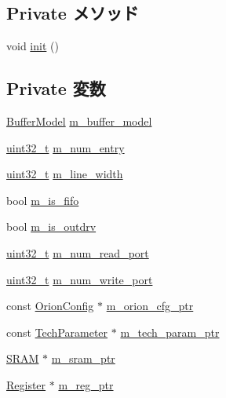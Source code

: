 \subsection*{Private メソッド}
\begin{DoxyCompactItemize}
\item 
void \hyperlink{classBuffer_a02fd73d861ef2e4aabb38c0c9ff82947}{init} ()
\end{DoxyCompactItemize}
\subsection*{Private 変数}
\begin{DoxyCompactItemize}
\item 
\hyperlink{classBuffer_aaa1b52e516aa86db344256019b904840}{BufferModel} \hyperlink{classBuffer_a9834deea607a93506904e1f399737596}{m\_\-buffer\_\-model}
\item 
\hyperlink{Type_8hh_a435d1572bf3f880d55459d9805097f62}{uint32\_\-t} \hyperlink{classBuffer_a291c35e9632031ebe307862c5c760519}{m\_\-num\_\-entry}
\item 
\hyperlink{Type_8hh_a435d1572bf3f880d55459d9805097f62}{uint32\_\-t} \hyperlink{classBuffer_add4c54b54475120d0e1547d3a9c48f44}{m\_\-line\_\-width}
\item 
bool \hyperlink{classBuffer_a6278bce84ca8f1587dbb706ad2d20012}{m\_\-is\_\-fifo}
\item 
bool \hyperlink{classBuffer_abf268b469077bf0460d0043b68443b6a}{m\_\-is\_\-outdrv}
\item 
\hyperlink{Type_8hh_a435d1572bf3f880d55459d9805097f62}{uint32\_\-t} \hyperlink{classBuffer_a0bf03d796dd95afdc5077aa3a1bef997}{m\_\-num\_\-read\_\-port}
\item 
\hyperlink{Type_8hh_a435d1572bf3f880d55459d9805097f62}{uint32\_\-t} \hyperlink{classBuffer_a2c7430e3adc3731c7d4d7b23a12bc0e2}{m\_\-num\_\-write\_\-port}
\item 
const \hyperlink{classOrionConfig}{OrionConfig} $\ast$ \hyperlink{classBuffer_a84de60ae1f7ca812df5347e27a658c77}{m\_\-orion\_\-cfg\_\-ptr}
\item 
const \hyperlink{classTechParameter}{TechParameter} $\ast$ \hyperlink{classBuffer_a11d1644aa2bfe0e16783dface6fadf13}{m\_\-tech\_\-param\_\-ptr}
\item 
\hyperlink{classSRAM}{SRAM} $\ast$ \hyperlink{classBuffer_a8a6d79435b3c974cbb1e303de1ab32c9}{m\_\-sram\_\-ptr}
\item 
\hyperlink{classRegister}{Register} $\ast$ \hyperlink{classBuffer_aa07e1d495ebbcf128a3b5976688f4a19}{m\_\-reg\_\-ptr}
\end{DoxyCompactItemize}


